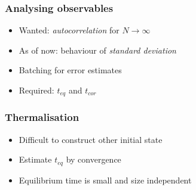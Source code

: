

\begin{frame}
    \frametitle{Analysing observables}

    \begin{itemize}
        \item Wanted: \emph{autocorrelation} for $N \rightarrow \infty$
        \item As of now: behaviour of \emph{standard deviation}
        \item Batching for error estimates
        \item Required: $t_{eq}$ and $t_{cor}$
    \end{itemize}
\end{frame}

\begin{frame}
    \frametitle{Thermalisation}

    \begin{itemize}
        \item Difficult to construct other initial state
        \item Estimate $t_{eq}$ by convergence \\[3mm]
        \item Equilibrium time is small and size independent %
    \end{itemize}
\end{frame}

